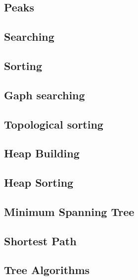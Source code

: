 \subsection{Peaks}

\newpage

\subsection{Searching}

\newpage

\subsection{Sorting}

\newpage

\subsection{Gaph searching}

\newpage

\subsection{Topological sorting}

\newpage

\subsection{Heap Building}


\subsection{Heap Sorting}

\newpage

\subsection{Minimum Spanning Tree}

\newpage

\subsection{Shortest Path}

\newpage

\subsection{Tree Algorithms}
